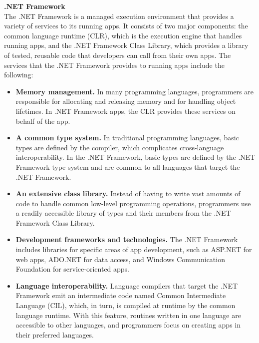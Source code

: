 \textbf{.NET Framework  \cite{software:.net}} \\
The .NET Framework is a managed execution environment that provides a variety of services to its running apps. It consists of two major components: the common language runtime (CLR), which is the execution engine that handles running apps, and the .NET Framework Class Library, which provides a library of tested, reusable code that developers can call from their own apps. The services that the .NET Framework provides to running apps include the following:
\begin{itemize}
    \item \textbf{Memory management.} In many programming languages, programmers are responsible for allocating and releasing memory and for handling object lifetimes. In .NET Framework apps, the CLR provides these services on behalf of the app.
    
    \item \textbf{A common type system.} In traditional programming languages, basic types are defined by the compiler, which complicates cross-language interoperability. In the .NET Framework, basic types are defined by the .NET Framework type system and are common to all languages that target the .NET Framework.

     \item \textbf{An extensive class library.} Instead of having to write vast amounts of code to handle common low-level programming operations, programmers use a readily accessible library of types and their members from the .NET Framework Class Library.

     \item \textbf{Development frameworks and technologies.} The .NET Framework includes libraries for specific areas of app development, such as ASP.NET for web apps, ADO.NET for data access, and Windows Communication Foundation for service-oriented apps.

     \item \textbf{Language interoperability.} Language compilers that target the .NET Framework emit an intermediate code named Common Intermediate Language (CIL), which, in turn, is compiled at runtime by the common language runtime. With this feature, routines written in one language are accessible to other languages, and programmers focus on creating apps in their preferred languages.
\end{itemize}

